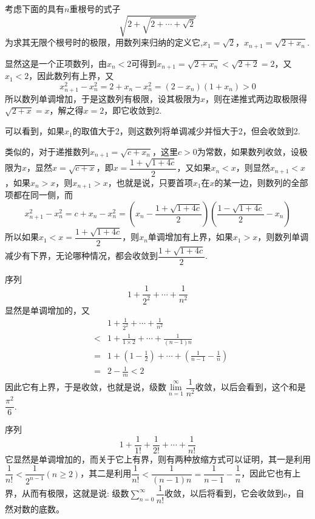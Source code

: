 \begin{example}
  考虑下面的具有$n$重根号的式子
  \[ \sqrt{2+\sqrt{2+\cdots+\sqrt{2}}} \]
  为求其无限个根号时的极限，用数列来归纳的定义它,$x_1=\sqrt{2}$，$x_{n+1}=\sqrt{2+x_n}$.

  显然这是一个正项数列，由$x_n<2$可得到$x_{n+1}=\sqrt{2+x_n}<\sqrt{2+2}=2$，又$x_1<2$，因此数列有上界，又
  \[ x_{n+1}^2-x_n^2=2+x_n-x_n^2=(2-x_n)(1+x_n)>0 \]
  所以数列单调增加，于是这数列有极限，设其极限为$x$，则在递推式两边取极限得$\sqrt{2+x}=x$，解之得$x=2$，即它收敛到2.

  可以看到，如果$x_1$的取值大于2，则这数列将单调减少并恒大于2，但会收敛到2.

  类似的，对于递推数列$x_{n+1}=\sqrt{c+x_n}$，这里$c>0$为常数，如果数列收敛，设极限为$x$，显然$x=\sqrt{c+x}$，即$x=\dfrac{1+\sqrt{1+4c}}{2}$，又如果$x_n<x$，则显然$x_{n+1}<x$，如果$x_n>x$，则$x_{n+1}>x$，也就是说，只要首项$x_1$在$x$的某一边，则数列的全部项都在同一侧，而
  \[ x_{n+1}^2-x_n^2=c+x_n-x_n^2=\left( x_n - \frac{1+\sqrt{1+4c}}{2} \right)\left( \frac{1-\sqrt{1+4c}}{2}-x_n \right) \]
  所以如果$x_1<x=\dfrac{1+\sqrt{1+4c}}{2}$，则$x_n$单调增加有上界，如果$x_1>x$，则数列单调减少有下界，无论哪种情况，都会收敛到$\dfrac{1+\sqrt{1+4c}}{2}$.
\end{example}

\begin{example}
  序列
  \[ 1+\frac{1}{2^2}+\cdots+\frac{1}{n^2} \]
  显然是单调增加的，又
  \begin{eqnarray*}
    && 1+\frac{1}{2^2}+\cdots+\frac{1}{n^2} \\
    & < & 1 + \frac{1}{1\times 2}+\cdots+\frac{1}{(n-1)n} \\
    & = & 1+\left( 1-\frac{1}{2} \right)+\cdots+\left( \frac{1}{n-1}-\frac{1}{n} \right) \\
    & = & 2-\frac{1}{m} < 2
  \end{eqnarray*}
  因此它有上界，于是收敛，也就是说，级数$\lim\limits_{n=1}^{\infty}\dfrac{1}{n^2}$收敛，以后会看到，这个和是$\dfrac{\pi^2}{6}$.
\end{example}

\begin{example}
  序列
  \[ 1+\frac{1}{1!} + \frac{1}{2!} + \cdots + \frac{1}{n!} \]
  它显然是单调增加的，而关于它上有界，则有两种放缩方式可以证明，其一是利用$\dfrac{1}{n!}<\dfrac{1}{2^{n-1}}(n \geqslant 2)$，其二是利用$\dfrac{1}{n!}<\dfrac{1}{(n-1)n}=\dfrac{1}{n-1}-\dfrac{1}{n}$，因此它也有上界，从而有极限，这就是说: 级数$\sum\limits_{n=0}^{\infty} \dfrac{1}{n!}$收敛，以后将看到，它会收敛到$\mathrm{e}$，自然对数的底数。
\end{example}


